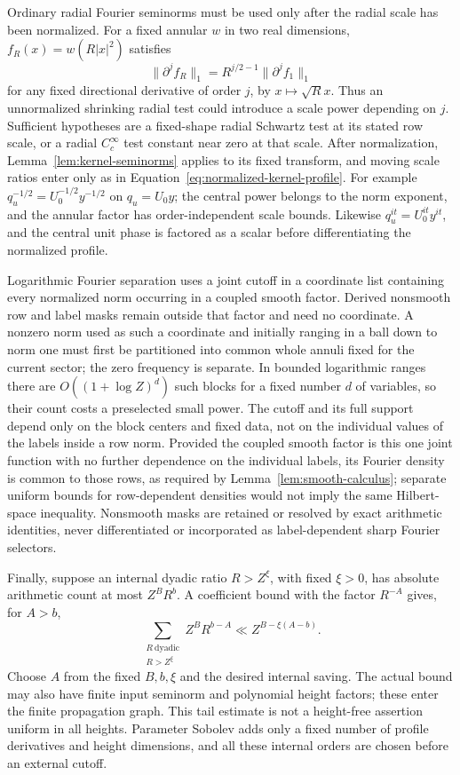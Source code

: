 \documentclass[11pt,a4paper]{article}
\numberwithin{equation}{section}
\numberwithin{figure}{section}
\theoremstyle{definition}
\theoremstyle{remark}
\begin{document}
Ordinary radial Fourier seminorms must be used only after the radial scale
has been normalized.  For a fixed annular $w$ in two real dimensions,
$f_R(x)=w(R|x|^2)$ satisfies
\[
 \|\partial^j f_R\|_1=R^{j/2-1}\|\partial^j f_1\|_1
\]
for any fixed directional derivative of order $j$, by $x\mapsto\sqrt R x$.
Thus an unnormalized shrinking radial test could introduce a scale power
depending on $j$.  Sufficient hypotheses are a fixed-shape radial Schwartz
test at its stated row scale, or a radial $C_c^\infty$ test constant near
zero at that scale.  After normalization, Lemma~\ref{lem:kernel-seminorms}
applies to its fixed transform, and moving scale ratios enter only as in
Equation~\eqref{eq:normalized-kernel-profile}.  For example
$q_u^{-1/2}=U_0^{-1/2}y^{-1/2}$ on $q_u=U_0y$; the central power belongs to
the norm exponent, and the annular factor has order-independent scale bounds.
Likewise $q_u^{it}=U_0^{it}y^{it}$, and the central unit phase is factored
as a scalar before differentiating the normalized profile.

Logarithmic Fourier separation uses a joint cutoff in a coordinate list
containing every normalized norm occurring in a coupled smooth factor.
Derived nonsmooth row and label masks remain outside that factor and need no
coordinate.  A nonzero norm used as such a coordinate and initially ranging in
a ball down to norm one must first be partitioned into common whole annuli
fixed for the current sector; the zero frequency is separate.
In bounded logarithmic ranges there
are $O((1+\log Z)^d)$ such blocks for a fixed number $d$ of variables, so
their count costs a preselected small power.  The cutoff and its full support
depend only on the block centers and fixed data, not on the individual values
of the labels inside a row norm.
Provided the coupled smooth factor is this one joint function with no
further dependence on the individual labels, its Fourier density is common
to those rows, as required by
Lemma~\ref{lem:smooth-calculus}; separate uniform bounds for row-dependent
densities would not imply the same Hilbert-space inequality.  Nonsmooth
masks are retained or resolved by exact arithmetic identities, never
differentiated or incorporated as label-dependent sharp Fourier selectors.

Finally, suppose an internal dyadic ratio $R>Z^\xi$, with fixed $\xi>0$,
has absolute arithmetic count at most $Z^B R^b$.  A coefficient bound with
the factor $R^{-A}$ gives, for $A>b$,
\[
 \sum_{\substack{R\ \mathrm{dyadic}\\R>Z^\xi}}Z^B R^{b-A}
       \ll Z^{B-\xi(A-b)}.
\]
Choose $A$ from the fixed $B,b,\xi$ and the desired internal saving.  The
actual bound may also have finite input seminorm and polynomial height
factors; these enter the finite propagation graph.  This tail estimate is
not a height-free assertion uniform in all heights.  Parameter Sobolev adds
only a fixed number of profile derivatives and height dimensions, and all
these internal orders are chosen before an external cutoff.
\end{document}
